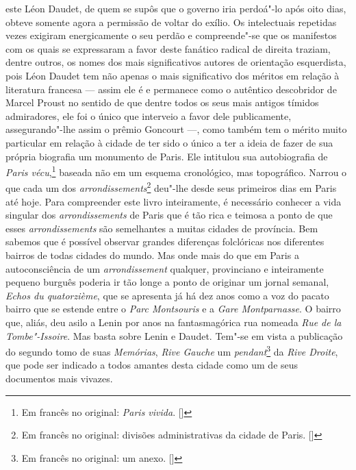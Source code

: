 este Léon Daudet, de quem se supôs que o governo iria perdoá"-lo após
oito dias, obteve somente agora a permissão de voltar do exílio. Os
intelectuais repetidas vezes exigiram energicamente o seu perdão e
compreende"-se que os manifestos com os quais se expressaram a favor
deste fanático radical de direita traziam, dentre outros, os nomes dos
mais significativos autores de orientação esquerdista, pois Léon Daudet
tem não apenas o mais significativo dos méritos em relação à literatura
francesa --- assim ele é e permanece como o autêntico descobridor de
Marcel Proust no sentido de que dentre todos os seus mais antigos
tímidos admiradores, ele foi o único que interveio a favor dele
publicamente, assegurando"-lhe assim o prêmio Goncourt ---, como também
tem o mérito muito particular em relação à cidade de ter sido o único a
ter a ideia de fazer de sua própria biografia um monumento de Paris. Ele
intitulou sua autobiografia de \emph{Paris vécu},\footnote{Em francês no original: \emph{Paris vivida}. []} baseada não em um esquema cronológico,
mas topográfico. Narrou o que cada um dos
\emph{arrondissements}\footnote{Em francês no original: divisões
  administrativas da cidade de Paris. []} deu"-lhe desde seus primeiros dias
em Paris até hoje. Para compreender este livro inteiramente, é
necessário conhecer a vida singular dos \emph{arrondissements} de Paris
que é tão rica e teimosa a ponto de que esses \emph{arrondissements} são semelhantes
a muitas cidades de província. Bem sabemos que é possível observar grandes
diferenças folclóricas nos diferentes bairros de todas cidades do mundo.
Mas onde mais do que em Paris a autoconsciência de um
\emph{arrondissement} qualquer, provinciano e inteiramente pequeno
burguês poderia ir tão longe a ponto de originar um jornal semanal,
\emph{Echos du quatorzième}, que se apresenta já há dez anos como a voz
do pacato bairro que se estende entre o \emph{Parc Montsouris} e a
\emph{Gare Montparnasse}. O bairro que, aliás, deu asilo a Lenin por anos
na fantasmagórica rua nomeada \emph{Rue de la Tombe"-Issoire}. Mas basta
sobre Lenin e Daudet. Tem"-se em vista a publicação do segundo tomo de
suas \emph{Memórias}, \emph{Rive Gauche} um \emph{pendant}\footnote{Em francês no original: um anexo. []} da \emph{Rive Droite}, que pode ser
indicado a todos amantes desta cidade como um de seus documentos mais
vivazes.

